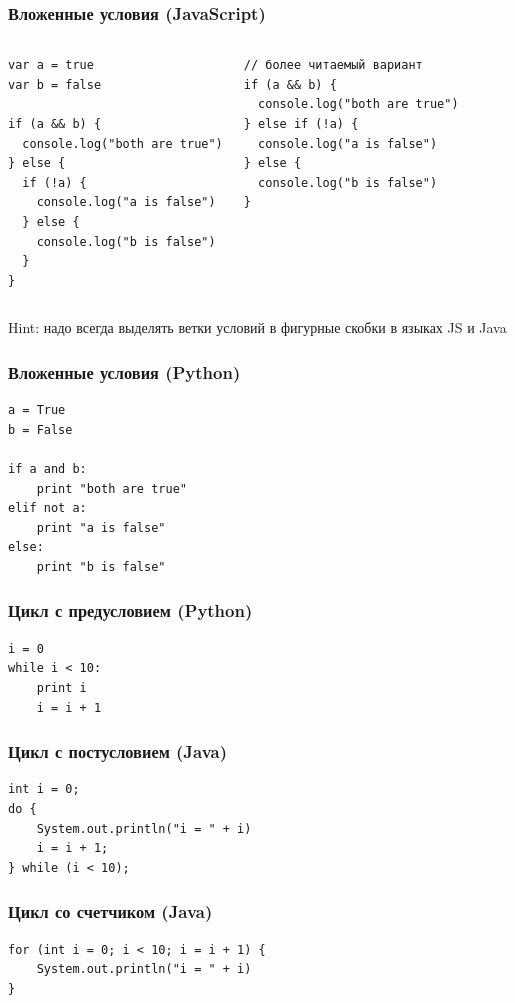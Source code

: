 {\begin{frame}[fragile]
\frametitle{Вложенные условия (JavaScript)}
\begin{columns}
    \begin{verbatim}
var a = true
var b = false

if (a && b) {
  console.log("both are true")
} else {
  if (!a) {
    console.log("a is false")
  } else {
    console.log("b is false")
  }
}
    \end{verbatim}
    \begin{verbatim}
// более читаемый вариант
if (a && b) {
  console.log("both are true")
} else if (!a) {
  console.log("a is false")
} else {
  console.log("b is false")
}
    \end{verbatim}
  \end{columns}
  Hint: надо всегда выделять ветки условий в фигурные скобки в языках JS и Java
\end{frame}

\begin{frame}[fragile]
\frametitle{Вложенные условия (Python)}
  \begin{verbatim}
a = True
b = False

if a and b:
    print "both are true"
elif not a:
    print "a is false"
else:
    print "b is false"
  \end{verbatim}
\end{frame}

\begin{frame}[fragile]
\frametitle{Цикл с предусловием (Python)}
  \begin{verbatim}
i = 0
while i < 10:
    print i
    i = i + 1
  \end{verbatim}
\end{frame}

\begin{frame}[fragile]
  \frametitle{Цикл с постусловием (Java)}
  \begin{verbatim}
int i = 0;
do {
    System.out.println("i = " + i)
    i = i + 1;
} while (i < 10);
  \end{verbatim}
\end{frame}

\begin{frame}[fragile]
  \frametitle{Цикл со счетчиком (Java)}
  \begin{verbatim}
for (int i = 0; i < 10; i = i + 1) {
    System.out.println("i = " + i)
}
  \end{verbatim}
\end{frame}

}
